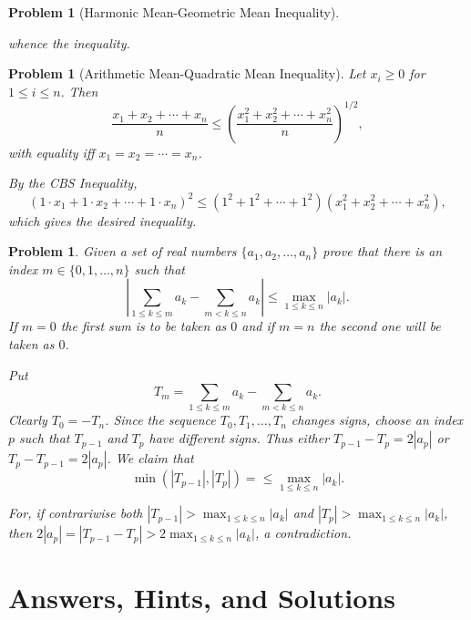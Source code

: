 \documentclass[11pt, openany]{book}
\theoremstyle{change} \theoremheaderfont{\blue\sffamily\bfseries}
\newtheorem{pro}[thm]{Problem}
\theoremstyle{nonumberplain} \theoremheaderfont{\sffamily\bfseries}
\def\absval#1{\left| #1 \right|}
\newcommand{\í}{\'{\i}}
\begin{document}
\begin{multicols}{2}
\begin{pro}[Harmonic
Mean-Geometric Mean Inequality]
\begin{answer}
whence the inequality.
\end{answer}
\end{pro}
\begin{pro}[Arithmetic
Mean-Quadratic Mean Inequality] Let $x_i\geq 0$ for $1 \leq i \leq
n$. Then
$$ \dfrac{x_1+x_2+\cdots + x_n}{n} \leq \left(\dfrac{x_1 ^2+x_2 ^2+\cdots + x_n ^2}{n}\right)^{1/2},  $$
with equality iff $x_1=x_2=\cdots =x_n$.
\begin{answer}By the CBS Inequality,
$$ \left(1\cdot x_1 + 1\cdot x_2 + \cdots + 1\cdot x_n\right)^2\leq \left(1^2+1^2+ \cdots + 1^2\right)\left(x_1 ^2 + x_2 ^2 + \cdots + x_n ^2\right),
$$which gives the desired inequality.
\end{answer}
\end{pro}

\begin{pro} Given a set of real numbers $\{a_1, a_2, \ldots , a_n\}$
prove that there is an index $m\in \{0,1,\ldots , n\}$ such that $$
\absval{\sum _{1\leq k \leq m} a_k - \sum _{m<k \leq n}a_k}\leq \max
_{1\leq k \leq n}\absval{a_k}.$$If $m=0$ the first sum is to be
taken as $0$ and if $m=n$ the second one will be taken as $0$.
\begin{answer}
Put $$  T_m = \sum _{1\leq k \leq m} a_k - \sum _{m<k \leq
n}a_k.$$Clearly $T_0 = -T_n$. Since the sequence $T_0, T_1, \ldots ,
T_n$ changes signs, choose an index $p$ such that $T_{p-1}$ and
$T_p$ have different signs. Thus either $T_{p-1}-T_p = 2|a_p|$ or
$T_p-T_{p-1}=2|a_p|$.  We claim that
$$ \min \left(\absval{T_{p-1}}, \absval{T_p}\right)=  \leq \max _{1\leq k \leq n}\absval{a_k}. $$

For, if contrariwise both $\absval{T_{p-1}} >  \max _{1\leq k \leq
n}\absval{a_k}$ and $\absval{T_p }>  \max _{1\leq k \leq
n}\absval{a_k}$, then $2|a_p|=|T_{p-1}-T_p|>2\max _{1\leq k \leq
n}\absval{a_k}$, a contradiction.
\end{answer}
\end{pro}
\end{multicols}




\appendix
\renewcommand{\chaptername}{Appendix}
\chapter{Answers, Hints, and Solutions}

   
\printindex
\end{document}
